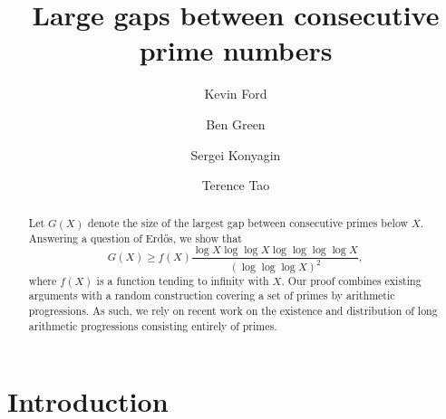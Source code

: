 \documentclass[12pt]{amsart}
\numberwithin{equation}{section}  %
\theoremstyle{remark}
\theoremstyle{plain}
\numberwithin{equation}{section}
\renewcommand{\geq}{\geqslant}
\renewcommand{\(}{\left(}
\renewcommand{\)}{\right)}
\begin{document}
\title{Large gaps between consecutive prime numbers}

\author{Kevin Ford}
\address{Department of Mathematics\\ 1409 West Green Street \\ University
of Illinois at Urbana-Champaign\\ Urbana, IL 61801\\ USA}

\author{Ben Green}
\address{Mathematical Institute\\
Radcliffe Observatory Quarter\\
Woodstock Road\\
Oxford OX2 6GG\\
England }

\author{Sergei Konyagin}
\address{Steklov Mathematical Institute\\
8 Gubkin Street\\
Moscow, 119991\\
Russia}


\author{Terence Tao}
\address{Department of Mathematics, UCLA\\
405 Hilgard Ave\\
Los Angeles CA 90095\\
USA}

\begin{abstract}Let $G(X)$ denote the size of the largest gap between consecutive primes below $X$. Answering a question of Erd\H{o}s, we show that  \[ G(X) \geq f(X) \frac{\log X \log \log X \log \log \log \log X}{(\log \log \log X)^2},\] where $f(X)$ is a function tending to infinity with $X$.  Our proof combines existing arguments with a random construction covering a set of primes by arithmetic progressions.  As such, we rely on recent work on the existence and distribution of long arithmetic progressions consisting entirely of primes.
\end{abstract}

\maketitle

\newpage
\setcounter{tocdepth}{1}
\tableofcontents



\section{Introduction}
\end{document}
